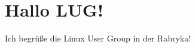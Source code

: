 \documentclass{article}
\begin{document}
\section{Hallo LUG!}
Ich begrüße die Linux User Group in der Rabryka!
\end{document}
